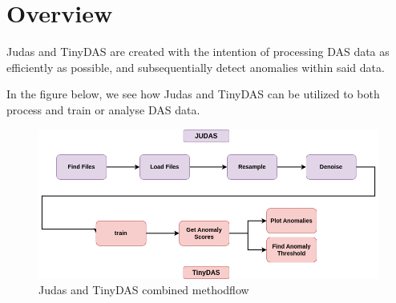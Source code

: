 \section{Overview}

Judas and TinyDAS are created with the intention of processing DAS data as efficiently as possible, and subsequentially detect anomalies within said data. 

In the figure below, we see how Judas and TinyDAS can be utilized to both process and train or analyse DAS data.

\begin{figure}[!h]
    \centering
    \includegraphics[scale=.5]{figures/api_overview.png}
    \caption{Judas and TinyDAS combined methodflow}
    \label{fig:judasnet_overview}
\end{figure}